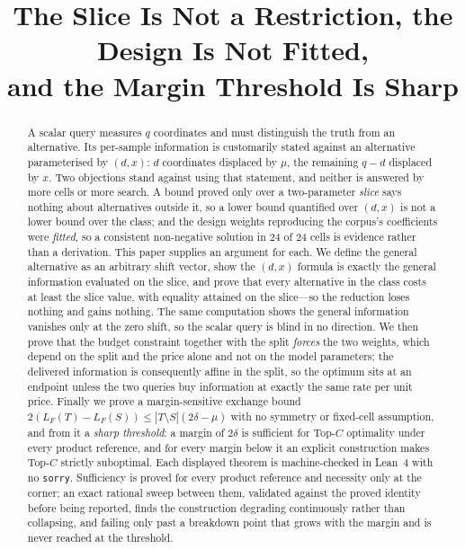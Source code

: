 \documentclass[conference]{IEEEtran}
\theoremstyle{definition}
\begin{document}
\title{The Slice Is Not a Restriction, the Design Is Not Fitted,\\
and the Margin Threshold Is Sharp}

\author{
}

\maketitle

\begin{abstract}
A scalar query measures $q$ coordinates and must distinguish the truth from an alternative.
Its per-sample information is customarily stated against an alternative parameterised by
$(d,x)$: $d$ coordinates displaced by $\mu$, the remaining $q-d$ displaced by $x$. Two
objections stand against using that statement, and neither is answered by more cells or more
search. A bound proved only over a two-parameter \emph{slice} says nothing about alternatives
outside it, so a lower bound quantified over $(d,x)$ is not a lower bound over the class; and
the design weights reproducing the corpus's coefficients were \emph{fitted}, so a consistent
non-negative solution in $24$ of $24$ cells is evidence rather than a derivation. This paper
supplies an argument for each. We define the general alternative as an arbitrary shift
vector, show the $(d,x)$ formula is exactly the general information evaluated on the slice,
and prove that every alternative in the class costs at least the slice value, with equality
attained on the slice---so the reduction loses nothing and gains nothing. The same
computation shows the general information vanishes only at the zero shift, so the scalar
query is blind in no direction. We then prove that the budget constraint together with the
split \emph{forces} the two weights, which depend on the split and the price alone and not on
the model parameters; the delivered information is consequently affine in the split, so the
optimum sits at an endpoint unless the two queries buy information at exactly the same rate
per unit price. Finally we prove a margin-sensitive exchange bound
$2(L_{F}(T)-L_{F}(S))\le|T\setminus S|(2\delta-\mu)$ with no symmetry or fixed-cell
assumption, and from it a \emph{sharp threshold}: a margin of $2\delta$ is sufficient for
Top-$C$ optimality under every product reference, and for every margin below it an explicit
construction makes Top-$C$ strictly suboptimal. Each displayed theorem is machine-checked in
Lean~4 with no \texttt{sorry}. Sufficiency is proved for every product reference and
necessity only at the corner; an exact rational sweep between them, validated against the
proved identity before being reported, finds the construction degrading continuously rather
than collapsing, and failing only past a breakdown point that grows with the margin and is
never reached at the threshold.
\end{abstract}
\end{document}
